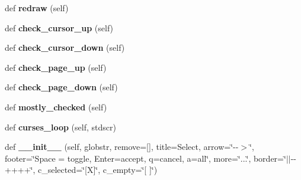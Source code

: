 \begin{DoxyCompactItemize}
def {\bfseries redraw} (self)
\item 
\mbox{\label{classdsmacc_1_1helperscripts_1_1picker_1_1Picker_aaa479b428bd9637e918b946d6b8b1a21}} 
def {\bfseries check\+\_\+cursor\+\_\+up} (self)
\item 
\mbox{\label{classdsmacc_1_1helperscripts_1_1picker_1_1Picker_a5a728857d9b76244b9807928851343db}} 
def {\bfseries check\+\_\+cursor\+\_\+down} (self)
\item 
\mbox{\label{classdsmacc_1_1helperscripts_1_1picker_1_1Picker_ae283e479adc98a6f7963c3e0a9fbf3c2}} 
def {\bfseries check\+\_\+page\+\_\+up} (self)
\item 
\mbox{\label{classdsmacc_1_1helperscripts_1_1picker_1_1Picker_a019a8b2c41155d81018e4f7c37b4bfb5}} 
def {\bfseries check\+\_\+page\+\_\+down} (self)
\item 
\mbox{\label{classdsmacc_1_1helperscripts_1_1picker_1_1Picker_a7eef2b7b214a2f0a9bdcd30f52a38388}} 
def {\bfseries mostly\+\_\+checked} (self)
\item 
\mbox{\label{classdsmacc_1_1helperscripts_1_1picker_1_1Picker_a8da72aab7c1da0a65a6a092bab0fa366}} 
def {\bfseries curses\+\_\+loop} (self, stdscr)
\item 
\mbox{\label{classdsmacc_1_1helperscripts_1_1picker_1_1Picker_a20ae49baacbbf2193d8156f7c48d5c15}} 
def {\bfseries \+\_\+\+\_\+init\+\_\+\+\_\+} (self, globstr, remove=\mbox{[}\textquotesingle{}\textquotesingle{}\mbox{]}, title=\textquotesingle{}Select\textquotesingle{}, arrow=\char`\"{}-\/-\/$>$\char`\"{}, footer=\char`\"{}Space = toggle,  Enter=accept,  q=cancel,  a=all\char`\"{}, more=\char`\"{}...\char`\"{}, border=\char`\"{}$\vert$$\vert$-\/-\/++++\char`\"{}, c\+\_\+selected=\char`\"{}\mbox{[}X\mbox{]}\char`\"{}, c\+\_\+empty=\char`\"{}\mbox{[} \mbox{]}\char`\"{})
\end{DoxyCompactItemize}
